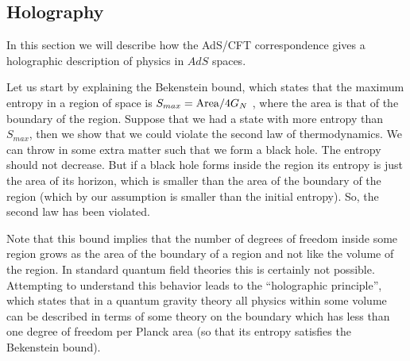 \subsection{Holography}
\label{holography}

In this section we will describe how the AdS/CFT correspondence
gives a holographic description of physics in $AdS$ spaces. 

Let us start by explaining the Bekenstein bound, which states that the
maximum entropy in a region of space is $S_{max} = { \rm Area}/4 G_N$
\cite{Bekenstein:1994dz}, where the area is that of the boundary of
the region.  Suppose that we had a state with more entropy than
$S_{max}$, then we show that we could violate the second law of
thermodynamics.  We can throw in some extra matter such that we form a
black hole. The entropy should not decrease. But if a black hole forms
inside the region its entropy is just the area of its horizon, which
is smaller than the area of the boundary of the region (which by our
assumption is smaller than the initial entropy).  So, the second law
has been violated.

Note that this bound implies that the number of degrees of freedom
inside some region grows  as the area of the boundary of a 
region and not like the volume
of the region. In standard quantum field theories this is certainly 
not possible. Attempting to understand this behavior leads to 
the ``holographic
principle'', which states that in a quantum gravity theory 
all physics within some volume
can be described in terms of some theory on the boundary which 
has less than one degree of freedom per Planck area 
\cite{'tHooft:1993gx,Susskind:1995vu} (so that its entropy satisfies the
Bekenstein bound). 

